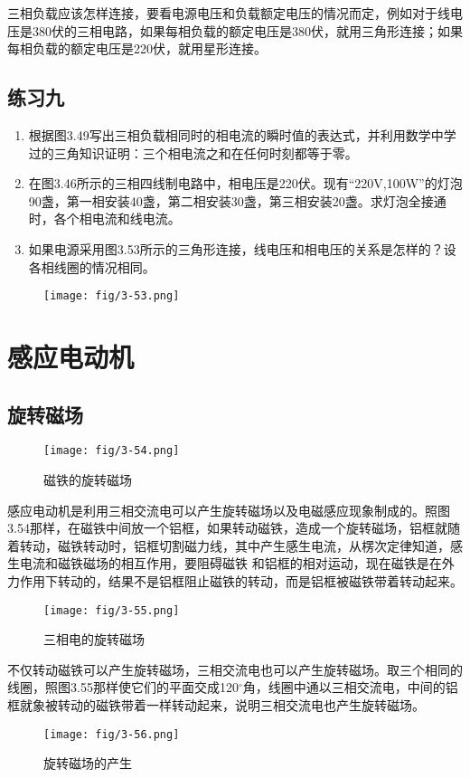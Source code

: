三相负载应该怎样连接，要看电源电压和负载额定电压的情况而定，例如对于线电压是380伏的三相电路，如果每相负载的额定电压是380伏，就用三角形连接；如果每相负载的额定电压是220伏，就用星形连接。

\subsection*{练习九}
\begin{enumerate}
    \item 根据图3.49写出三相负载相同时的相电流的瞬时值的表达式，并利用数学中学过的三角知识证明：三个相电流之和在任何时刻都等于零。
    \item 在图3.46所示的三相四线制电路中，相电压是220伏。现有“220V,100W”的灯泡90盏，第一相安装40盏，第二相安装30盏，第三相安装20盏。求灯泡全接通时，各个相电流和线电流。
    \item 如果电源采用图3.53所示的三角形连接，线电压和相电压的关系是怎样的？设各相线圈的情况相同。
\end{enumerate}
\begin{figure}[htp]\centering
\texttt{[image: fig/3-53.png]}
\caption{}
\end{figure}


\section{感应电动机}
\subsection{旋转磁场}
\begin{figure}[htp]\centering
\texttt{[image: fig/3-54.png]}
\caption{磁铁的旋转磁场}
\end{figure}

感应电动机是利用三相交流电可以产生旋转磁场以及电磁感应现象制成的。照图3.54那样，在磁铁中间放一个铝框，如果转动磁铁，造成一个旋转磁场，铝框就随着转动，磁铁转动时，铝框切割磁力线，其中产生感生电流，从楞次定律知道，感生电流和磁铁磁场的相互作用，要阻碍磁铁
和铝框的相对运动，现在磁铁是在外力作用下转动的，结果不是铝框阻止磁铁的转动，而是铝框被磁铁带着转动起来。
\begin{figure}[htp]\centering
\texttt{[image: fig/3-55.png]}
\caption{三相电的旋转磁场}
\end{figure}

不仅转动磁铁可以产生旋转磁场，三相交流电也可以产生旋转磁场。取三个相同的线圈，照图3.55那样使它们的平面交成120$^\circ$角，线圈中通以三相交流电，中间的铝框就象被转动的磁铁带着一样转动起来，说明三相交流电也产生旋转磁场。
\begin{figure}[htp]\centering
\texttt{[image: fig/3-56.png]}
\caption{旋转磁场的产生}
\end{figure}

